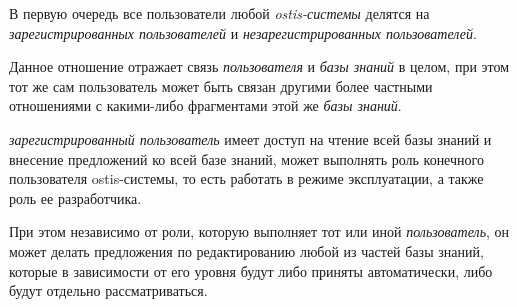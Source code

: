 В первую очередь все пользователи любой \textit{ostis-системы} делятся на \textit{зарегистрированных пользователей} и \textit{незарегистрированных пользователей}.

\begin{SCn}

\begin{scnindent}
	\begin{scneqtoset}
	\end{scneqtoset}
\end{scnindent}
\end{SCn}

Данное отношение отражает связь \textit{пользователя} и \textit{базы знаний} в целом, при этом тот же сам пользователь может быть связан другими более частными отношениями с какими-либо фрагментами этой же \textit{базы знаний}.

\textit{зарегистрированный пользователь} имеет доступ на чтение всей базы знаний и внесение предложений ко всей базе знаний, может выполнять роль конечного пользователя ostis-системы, то есть работать в режиме эксплуатации, а также роль ее разработчика. 

При этом независимо от роли, которую выполняет тот или иной \textit{пользователь}, он может делать предложения по редактированию любой из частей базы знаний, которые в зависимости от его уровня будут либо приняты автоматически, либо будут отдельно рассматриваться.

\begin{SCn}
\end{SCn}

